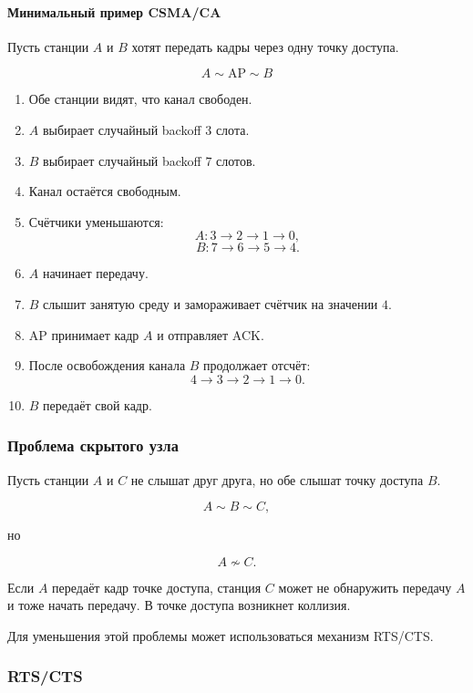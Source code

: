 \documentclass[12pt,a4paper]{article}
\begin{document}
\paragraph{Минимальный пример CSMA/CA}

Пусть станции $A$ и $B$ хотят передать кадры через одну точку доступа.

\[
A \sim \text{AP} \sim B
\]

\begin{enumerate}
    \item Обе станции видят, что канал свободен.
    \item $A$ выбирает случайный backoff $3$ слота.
    \item $B$ выбирает случайный backoff $7$ слотов.
    \item Канал остаётся свободным.
    \item Счётчики уменьшаются:
    \[
    A: 3 \rightarrow 2 \rightarrow 1 \rightarrow 0,
    \]
    \[
    B: 7 \rightarrow 6 \rightarrow 5 \rightarrow 4.
    \]
    \item $A$ начинает передачу.
    \item $B$ слышит занятую среду и замораживает счётчик на значении $4$.
    \item AP принимает кадр $A$ и отправляет ACK.
    \item После освобождения канала $B$ продолжает отсчёт:
    \[
    4 \rightarrow 3 \rightarrow 2 \rightarrow 1 \rightarrow 0.
    \]
    \item $B$ передаёт свой кадр.
\end{enumerate}

\subsubsection{Проблема скрытого узла}

Пусть станции $A$ и $C$ не слышат друг друга, но обе слышат точку доступа $B$.

\[
A \sim B \sim C,
\]

но

\[
A \not\sim C.
\]

Если $A$ передаёт кадр точке доступа, станция $C$ может не обнаружить передачу $A$ и тоже начать передачу. В точке доступа возникнет коллизия.

Для уменьшения этой проблемы может использоваться механизм RTS/CTS.

\subsubsection{RTS/CTS}
\end{document}
